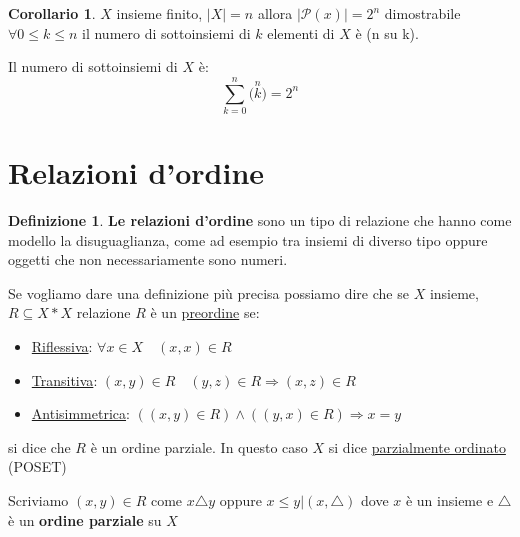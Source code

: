 \documentclass{article}
\theoremstyle{definition}
\newtheorem{definition}{Definizione}[section]
\newtheorem{corollario}{Corollario}[section]
\begin{document}
\begin{tcolorbox}
\begin{corollario}
$X$ insieme finito, $|X| = n$ allora $|\mathcal{P}(x)| = 2^n$ dimostrabile $\forall 0 \le k \le n$ il numero di sottoinsiemi di $k$ elementi di $X$ è (n su k). \par
Il numero di sottoinsiemi di $X$ è: 
\begin{equation*}
        \sum_{k=0}^{n}\Big(\overset{n}{k}\Big) = 2^n
\end{equation*}
\end{corollario}
\end{tcolorbox}





\newpage
\section{Relazioni d'ordine}\label{sec:relazioni_d_ordine}
\begin{definition}
\textbf{Le relazioni d'ordine} sono un tipo di relazione che hanno come modello la disuguaglianza, come ad esempio tra insiemi di diverso tipo oppure oggetti che non necessariamente sono numeri. \par
Se vogliamo dare una definizione più precisa possiamo dire che se $ X $  insieme, $ R \subseteq X * X $ relazione $ R $ è un \underline{preordine} se:
\end{definition}

\begin{tcolorbox}
\begin{itemize}
        \item \underline{Riflessiva}: $ \forall x \in X \quad (x,x) \in R$ 
        \item \underline{Transitiva}: $ (x,y) \in R \quad (y,z)  \in R \Rightarrow (x,z) \in R$ 
        \item \underline{Antisimmetrica}: $ ((x,y) \in R) \land ((y,x) \in R) \Rightarrow x = y $ 
\end{itemize}
\end{tcolorbox}

si dice che $ R $ è un ordine parziale. \newline
In questo caso $ X $ si dice \underline{parzialmente ordinato} (POSET) \par
Scriviamo $ (x,y) \in R $ come $ x \triangle y $ oppure $ x \le y | (x, \triangle)$  dove $x$ è un insieme e $ \triangle $ è un \textbf{ordine parziale} su $ X $    
\end{document}
